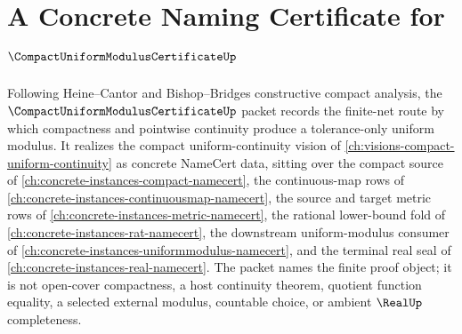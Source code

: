 \chapter{A Concrete Naming Certificate for $\CompactUniformModulusCertificateUp$}
\label{ch:concrete-instances-compact-uniform-modulus-certificate-namecert}

Following Heine--Cantor and Bishop--Bridges constructive compact analysis, the $\CompactUniformModulusCertificateUp$ packet records the finite-net route by which compactness and pointwise continuity produce a tolerance-only uniform modulus. It realizes the compact uniform-continuity vision of \autoref{ch:visions-compact-uniform-continuity} as concrete NameCert data, sitting over the compact source of \autoref{ch:concrete-instances-compact-namecert}, the continuous-map rows of \autoref{ch:concrete-instances-continuousmap-namecert}, the source and target metric rows of \autoref{ch:concrete-instances-metric-namecert}, the rational lower-bound fold of \autoref{ch:concrete-instances-rat-namecert}, the downstream uniform-modulus consumer of \autoref{ch:concrete-instances-uniformmodulus-namecert}, and the terminal real seal of \autoref{ch:concrete-instances-real-namecert}. The packet names the finite proof object; it is not open-cover compactness, a host continuity theorem, quotient function equality, a selected external modulus, countable choice, or ambient $\RealUp$ completeness.

